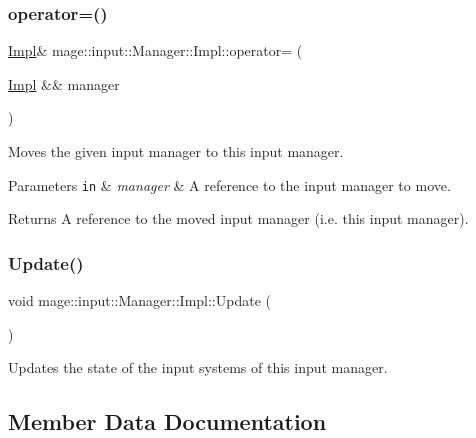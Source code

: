 \subsubsection{\texorpdfstring{operator=()}{operator=()}\hspace{0.1cm}{\footnotesize\ttfamily [2/2]}}
{\footnotesize\ttfamily \hyperlink{classmage_1_1input_1_1_manager_1_1_impl}{Impl}\& mage\+::input\+::\+Manager\+::\+Impl\+::operator= (\begin{DoxyParamCaption}\item[{\hyperlink{classmage_1_1input_1_1_manager_1_1_impl}{Impl} \&\&}]{manager }\end{DoxyParamCaption})\hspace{0.3cm}{\ttfamily [delete]}}

Moves the given input manager to this input manager.


\begin{DoxyParams}[1]{Parameters}
\mbox{\tt in}  & {\em manager} & A reference to the input manager to move. \\
\hline
\end{DoxyParams}
\begin{DoxyReturn}{Returns}
A reference to the moved input manager (i.\+e. this input manager). 
\end{DoxyReturn}
\hypertarget{classmage_1_1input_1_1_manager_1_1_impl_ac9e9b6d976dfdb2379664cf362c68600}{}\label{classmage_1_1input_1_1_manager_1_1_impl_ac9e9b6d976dfdb2379664cf362c68600} 
\subsubsection{\texorpdfstring{Update()}{Update()}}
{\footnotesize\ttfamily void mage\+::input\+::\+Manager\+::\+Impl\+::\+Update (\begin{DoxyParamCaption}{ }\end{DoxyParamCaption})\hspace{0.3cm}{\ttfamily [noexcept]}}

Updates the state of the input systems of this input manager. 

\subsection{Member Data Documentation}
\hypertarget{classmage_1_1input_1_1_manager_1_1_impl_afa76fc86c9bc75ac5c00414bc3d03fdb}{}\label{classmage_1_1input_1_1_manager_1_1_impl_afa76fc86c9bc75ac5c00414bc3d03fdb} 
